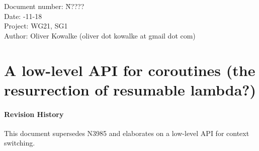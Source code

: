 \documentclass[a4paper,10pt,DIV15]{scrartcl}
\begin{document}
\small
\begin{tabbing}
    Document number: \= N????\\
    Date:            -11-18\\
    Project:         \> WG21, SG1\\
    Author:          \> Oliver Kowalke (oliver dot kowalke at gmail dot com)\\
\end{tabbing}

\section*{A low-level API for coroutines (the resurrection of resumable lambda?)}


\tableofcontents


\paragraph*{Revision History}
This document supersedes N3985 and elaborates on a low-level API for context
switching.












\end{document}
